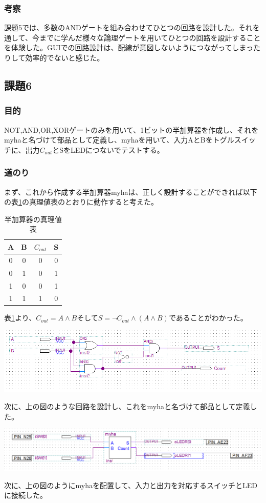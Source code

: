 \documentclass[a4paper]{jarticle}
\begin{document}
\subsubsection{考察}
課題5では、多数のANDゲートを組み合わせてひとつの回路を設計した。それを通して、今までに学んだ様々な論理ゲートを用いてひとつの回路を設計することを体験した。GUIでの回路設計は、配線が意図しないようにつながってしまったりして効率的でないと感じた。
\subsection{課題6}
\subsubsection{目的}
NOT,AND,OR,XORゲートのみを用いて、1ビットの半加算器を作成し、それをmyhaと名づけて部品として定義し、myhaを用いて、入力AとBをトグルスイッチに、出力$C_{out}$とSをLEDにつないでテストする。
\subsubsection{道のり}
まず、これから作成する半加算器myhaは、正しく設計することができれば以下の表\ref{Report6myha}の真理値表のとおりに動作すると考えた。
\begin{table}[ht]
	\begin{center}
		\caption{半加算器の真理値表}
		\label{Report6myha}
		\begin{tabular}{|c|c|c|c|}	\hline
			A	&B	&$C_{out}$	&S\\	\hline\hline
			0	&0	&0		&0\\	\hline
			0	&1	&0		&1\\	\hline
			1	&0	&0		&1\\	\hline
			1	&1	&1		&0\\	\hline
		\end{tabular}
	\end{center}
\end{table}
表\ref{Report6myha}より、$C_{out} = A \land B$そして$S = \lnot C_{out} \land \left( A \land B \right)$であることがわかった。
\begin{center}
	\includegraphics[width=15cm]{work6.PNG}
\end{center}
次に、上の図のような回路を設計し、これをmyhaと名づけて部品として定義した。
\begin{center}
	\includegraphics[width=15cm]{work6main.PNG}
\end{center}
次に、上の図のようにmyhaを配置して、入力と出力を対応するスイッチとLEDに接続した。
\end{document}
